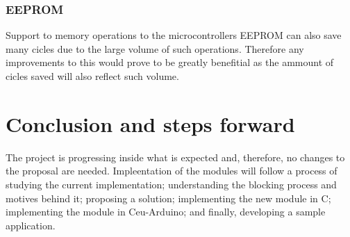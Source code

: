 \documentclass{article}
\begin{document}
\subsubsection{EEPROM}
\tab Support to memory operations to the microcontrollers EEPROM can also save many cicles due to the large volume of such operations. Therefore any improvements to this would prove to be greatly benefitial as the ammount of cicles saved will also reflect such volume.

\section{Conclusion and steps forward}
\tab The project is progressing inside what is expected and, therefore, no changes to the proposal are needed. Impleentation of the modules will follow a process of studying the current implementation; understanding the blocking process and motives behind it; proposing a solution; implementing the new module in C; implementing the module in Ceu-Arduino; and finally, developing a sample application.
\end{document}
